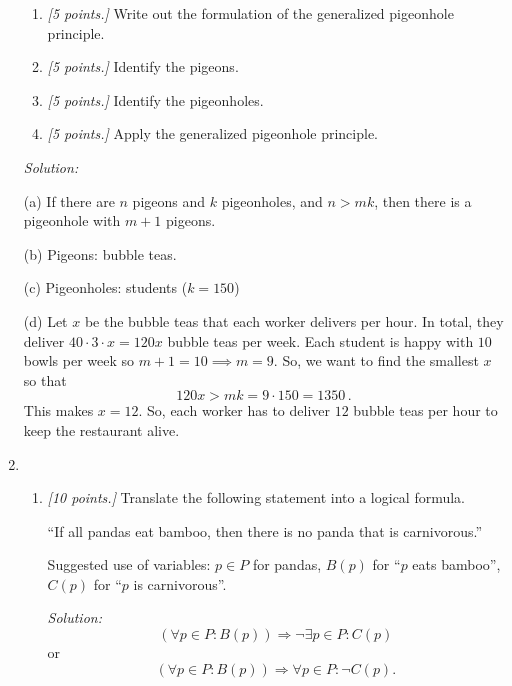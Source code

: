 \documentclass[12pt]{amsart}
\begin{document}
\begin{enumerate}[label=\arabic*.,itemsep=10pt, leftmargin=*]
        \begin{enumerate}
            \item
        \textit{[5 points.]}
            Write out the formulation of the generalized pigeonhole principle.
        
            \item 
        \textit{[5 points.]}
            Identify the pigeons.

            \item 
        \textit{[5 points.]}
            Identify the pigeonholes. 

            \item 
        \textit{[5 points.]}
            Apply the generalized pigeonhole principle.
        \end{enumerate}
        
\textit{Solution:}

(a) If there are $n$ pigeons and $k$ pigeonholes, and  
$n > mk$, then there is a pigeonhole with $m+1$ pigeons.

(b) Pigeons: bubble teas.

(c) Pigeonholes: students ($k = 150$)
        
(d) Let $x$ be the bubble teas that each worker delivers per hour.
In total, they deliver $40\cdot 3\cdot x = 120x$ bubble teas per week.
            Each student is happy with $10$ bowls per week so $m + 1 = 10\implies m = 9$.
            So, we want to find the smallest $x$ so that 
            \begin{equation*}
                120x > mk = 9\cdot 150 = 1350\,.
            \end{equation*}
            This makes $x = 12$.
            So, each worker has to deliver $12$ bubble teas per hour to keep
            the restaurant alive.

    \item 
        \begin{enumerate}
            \item 
        \textit{[10 points.]}
            Translate the following statement into a logical formula.
                
                ``If all pandas eat bamboo, then there is no panda that is carnivorous.''
                
            Suggested use of variables: $p\in P$ for pandas, $B(p)$ for ``$p$ eats bamboo'', $C(p)$ for  ``$p$ is carnivorous''.
            
            \textit{Solution:}
            $$ ( \forall p \in P : B(p) ) \Rightarrow 
            \neg \exists p \in P: C(p)
            $$
            or
            $$ ( \forall p \in P : B(p) ) \Rightarrow 
            \forall p \in P: \neg C(p)
            .$$



\end{enumerate}
\end{enumerate}
\end{document}
